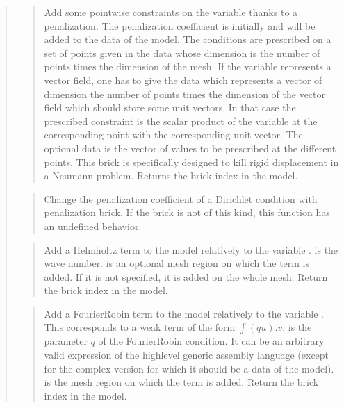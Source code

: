 \documentclass[a4paper,11pt,english]{sphinxmanual}
\begin{document}
\begin{quote}
\begin{quote}
Add some pointwise constraints on the variable  thanks to
a penalization. The penalization coefficient is initially
 and will be added to the data of the model.
The conditions are prescribed on a set of points given in the data
 whose dimension is the number of points times the dimension
of the mesh.
If the variable represents a vector field, one has to give the data
 which represents a vector of dimension the number of
points times the dimension of the vector field which should store some
unit vectors. In that case the prescribed constraint is the scalar
product of the variable at the corresponding point with the corresponding
unit vector.
The optional data  is the vector of values to be prescribed
at the different points.
This brick is specifically designed to kill rigid displacement
in a Neumann problem.
Returns the brick index in the model.
\end{quote}

\begin{quote}

Change the penalization coefficient of a Dirichlet condition with
penalization brick. If the brick is not of this kind, this
function has an undefined behavior.
\end{quote}

\begin{quote}

Add a Helmholtz term to the model relatively to the variable .
 is the wave number.  is an optional mesh
region on which the term is added. If it is not specified, it is added
on the whole mesh. Return the brick index in the model.
\end{quote}

\begin{quote}

Add a Fourier\sphinxhyphen{}Robin term to the model relatively to the variable
. This corresponds to a weak term of the form
\(\int (qu).v\).  is the parameter \(q\) of
the Fourier\sphinxhyphen{}Robin condition.  It can be an arbitrary valid expression
of the high\sphinxhyphen{}level generic assembly language (except for the complex version
for which it should be a data of the model).  is the mesh region
on which the term is added. Return the brick index in the model.
\end{quote}


\end{quote}
\end{document}
